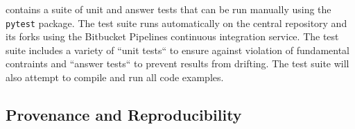 \grackle{} contains a suite of unit and answer
tests that can be run manually using the \texttt{pytest} package.  The
test suite runs automatically on the central repository and its
forks using the Bitbucket Pipelines continuous integration service.
The test suite includes a variety of ``unit tests`` to ensure against
violation of fundamental contraints and ``answer tests`` to prevent
results from drifting. The test suite will also attempt to compile and
run all code examples.




\subsection{Provenance and Reproducibility}

